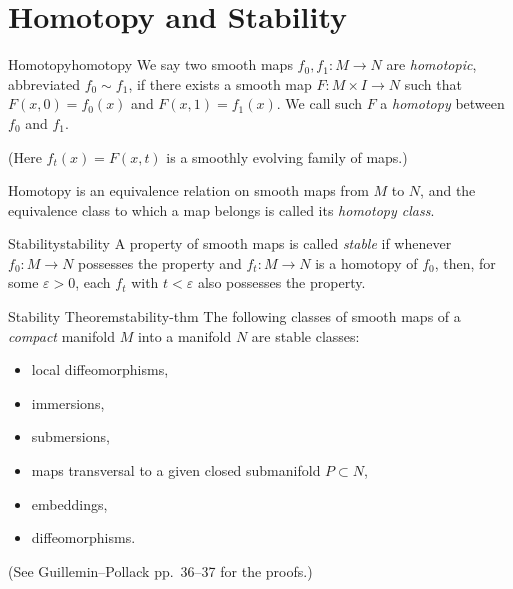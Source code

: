 \section{Homotopy and Stability}

\begin{definition}{Homotopy}{homotopy}
    We say two smooth maps $f_0, f_1 \colon M \to N$ are \emph{homotopic}, abbreviated $f_0 \sim f_1$, if there exists a smooth map $F \colon M \times I \to N$ such that $F(x,0) = f_0(x)$ and $F(x,1) = f_1(x)$. We call such $F$ a \emph{homotopy} between $f_0$ and $f_1$.

    (Here $f_t(x) = F(x,t)$ is a smoothly evolving family of maps.)
\end{definition}

Homotopy is an equivalence relation on smooth maps from $M$ to $N$, and the equivalence class to which a map belongs is called its \emph{homotopy class}.

\begin{definition}{Stability}{stability}
    A property of smooth maps is called \emph{stable} if whenever $f_0 \colon M \to N$ possesses the property and $f_t \colon M \to N$ is a homotopy of $f_0$, then, for some $\varepsilon > 0$, each $f_t$ with $t < \varepsilon$ also possesses the property.
\end{definition}

\begin{theorem}{Stability Theorem}{stability-thm}
    The following classes of smooth maps of a \emph{compact} manifold $M$ into a manifold $N$ are stable classes:
    \begin{itemize}
        \item local diffeomorphisms,
        \item immersions,
        \item submersions,
        \item maps transversal to a given closed submanifold $P \subset N$,
        \item embeddings,
        \item diffeomorphisms.
    \end{itemize}
    (See Guillemin--Pollack pp.~36--37 for the proofs.)
\end{theorem}
